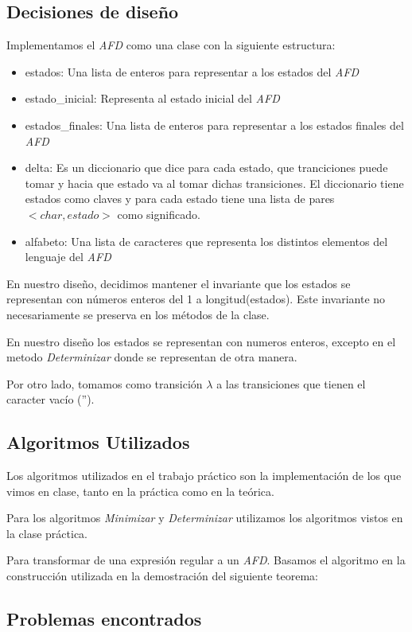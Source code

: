 \subsection{Decisiones de diseño}
Implementamos el \emph{AFD} como una clase con la siguiente estructura:

\begin{itemize}
	\item estados: Una lista de enteros para representar a los estados del \emph{AFD}
	\item estado\_inicial: Representa al estado inicial del \emph{AFD}
	\item estados\_finales: Una lista de enteros para representar a los estados finales del \emph{AFD}
	\item delta: Es un diccionario que dice para cada estado, que tranciciones puede tomar y hacia que estado va al tomar dichas transiciones. El diccionario tiene estados como claves y para cada estado tiene una lista de pares $<char, estado>$ como significado.
	\item alfabeto: Una lista de caracteres que representa los distintos elementos del lenguaje del \emph{AFD}
\end{itemize}

En nuestro diseño, decidimos mantener el invariante que los estados se representan con números enteros del 1 a longitud(estados). Este invariante no necesariamente se preserva en los métodos de la clase.

En nuestro diseño los estados se representan con numeros enteros, excepto en el metodo \emph{Determinizar} donde se representan de otra manera. %

Por otro lado, tomamos como transición $\lambda$ a las transiciones que tienen el caracter vacío ('').

\subsection{Algoritmos Utilizados}

Los algoritmos utilizados en el trabajo práctico son la implementación de los que vimos en clase, tanto en la práctica como en la teórica.

Para los algoritmos \emph{Minimizar} y \emph{Determinizar} utilizamos los algoritmos vistos en la clase práctica.

Para transformar de una expresión regular a un \emph{AFD}. Basamos el algoritmo en la construcción utilizada en la demostración del siguiente teorema:


\subsection{Problemas encontrados}
